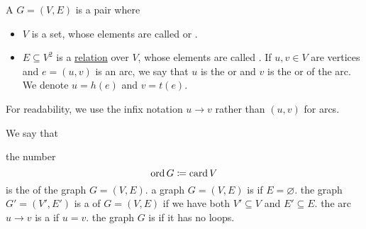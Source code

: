 \begin{definition}\label{def:directed_graph}\cite[1-graphs from chapter 1, section 1.1]{Gondran1984}
  A  \( G = (V, E) \) is a pair where
  \begin{itemize}
    \item \( V \) is a set, whose elements are called  or .
    \item \( E \subseteq V^2 \) is a \hyperref[def:relation]{relation} over \( V \), whose elements are called . If \( u, v \in V \) are vertices and \( e = (u, v) \) is an arc, we say that \( u \) is the  or  and \( v \) is the  or  of the arc. We denote $u = h(e)$ and $v = t(e)$.
  \end{itemize}

  For readability, we use the infix notation \( u \to v \) rather than \( (u, v) \) for arcs.

  We say that
  \begin{defenum}
     the number
    \begin{equation*}
      \operatorname{ord} G \coloneqq \operatorname{card} V
    \end{equation*}
    is the  of the graph \( G = (V, E) \).
     a graph \( G = (V, E) \) is  if \( E = \varnothing \).
     the graph \( G' = (V', E') \) is a  of \( G = (V, E) \) if we have both \( V' \subseteq V \) and \( E' \subseteq E \).
     the arc \( u \to v \) is a  if \( u = v \).
    \cite[chapter 1, section 1.3]{Gondran1984} the graph \( G \) is  if it has no loops.
  \end{defenum}
\end{definition}

